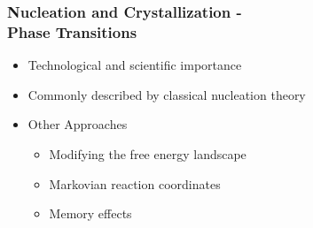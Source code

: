 \documentclass[smaller,notes=hide]{beamer}
\newlength{\wideitemsep}
\let\olditem\item
\renewcommand{\item}{\setlength{\itemsep}{\wideitemsep}\olditem}
\begin{document}
\fi


\iftrue

\begin{frame}
\frametitle{Nucleation and Crystallization - \\ \hfill Phase Transitions}
\begin{itemize}
\item Technological and scientific importance
\item Commonly described by classical nucleation theory\\
\vspace{0.5cm}
\item<0> Other Approaches
\begin{itemize}
\item Modifying the free energy landscape
\item Markovian reaction coordinates
\item Memory effects
\end{itemize}
\end{itemize}
\end{frame}
\end{document}
